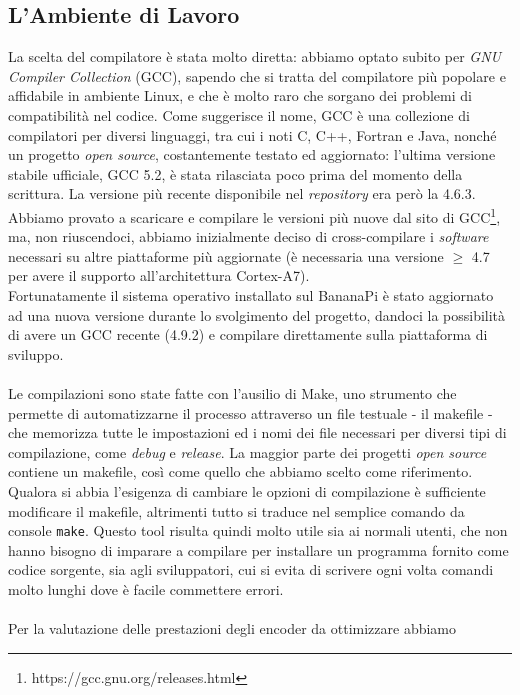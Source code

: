 \subsection{L'Ambiente di Lavoro}
La scelta del compilatore è stata molto diretta: abbiamo 
optato subito per 
\emph{GNU Compiler Collection} (GCC), sapendo che si tratta del compilatore più 
popolare e affidabile in ambiente Linux, e che è molto raro che sorgano dei 
problemi di compatibilità nel codice. Come suggerisce il nome, GCC è una 
collezione di compilatori per diversi linguaggi, tra cui i noti C, C++, Fortran 
e Java, nonché un progetto \emph{open source}, costantemente testato ed 
aggiornato: 
l'ultima versione stabile ufficiale, GCC 5.2, è stata rilasciata poco prima 
del momento della scrittura. La versione più recente disponibile nel 
\emph{repository} era però la 4.6.3. Abbiamo provato a 
scaricare e compilare le versioni più nuove dal sito di 
GCC\footnote{https://gcc.gnu.org/releases.html}, ma, non riuscendoci, abbiamo
inizialmente deciso di cross-compilare i \emph{software} necessari su altre
piattaforme più aggiornate (è necessaria una versione $\geq$ 4.7 per avere il
supporto all'architettura Cortex-A7). \\
Fortunatamente il sistema operativo installato sul BananaPi è stato aggiornato
ad una nuova versione durante lo svolgimento del progetto, dandoci la 
possibilità di avere un GCC recente (4.9.2) e compilare direttamente sulla
piattaforma di sviluppo.
\\ \\
Le compilazioni sono state fatte con l'ausilio di Make, 
uno strumento 
che permette di automatizzarne il processo attraverso un file 
testuale - il makefile - che memorizza tutte le impostazioni ed i nomi dei file 
necessari per diversi tipi di compilazione, come \emph{debug} e \emph{release}. 
La maggior 
parte dei progetti \emph{open source} contiene un makefile, così come quello 
che 
abbiamo scelto come riferimento. Qualora si abbia l'esigenza di cambiare le 
opzioni di 
compilazione è sufficiente modificare il makefile, altrimenti tutto si traduce 
nel semplice comando da console \verb|make|. Questo tool risulta quindi molto 
utile sia ai normali utenti, che non hanno bisogno di imparare a compilare per 
installare un 
programma fornito come codice sorgente, sia agli sviluppatori, cui 
si evita di scrivere ogni volta 
comandi molto lunghi dove è facile commettere errori.
\\ \\
Per la valutazione delle prestazioni degli encoder da ottimizzare abbiamo 
